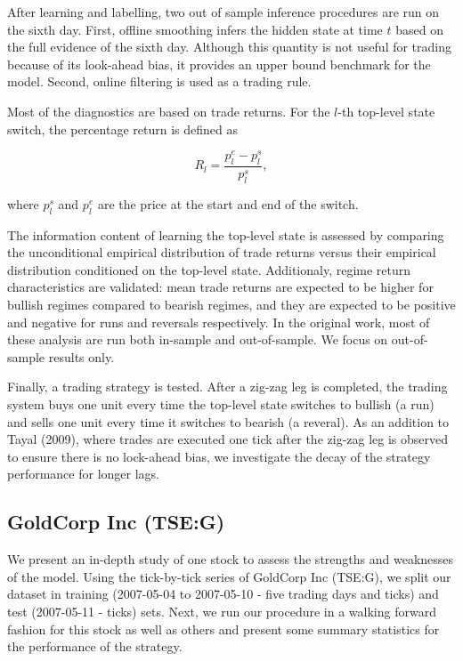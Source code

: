 \documentclass[]{article}
\begin{document}
After learning and labelling, two out of sample inference procedures are
run on the sixth day. First, offline smoothing infers the hidden state
at time \(t\) based on the full evidence of the sixth day. Although this
quantity is not useful for trading because of its look-ahead bias, it
provides an upper bound benchmark for the model. Second, online
filtering is used as a trading rule.

Most of the diagnostics are based on trade returns. For the \(l\)-th
top-level state switch, the percentage return is defined as

\[
R_l = \frac{p^e_l - p^s_l}{p^s_l},
\]

where \(p^s_l\) and \(p^e_l\) are the price at the start and end of the
switch.

The information content of learning the top-level state is assessed by
comparing the unconditional empirical distribution of trade returns
versus their empirical distribution conditioned on the top-level state.
Additionaly, regime return characteristics are validated: mean trade
returns are expected to be higher for bullish regimes compared to
bearish regimes, and they are expected to be positive and negative for
runs and reversals respectively. In the original work, most of these
analysis are run both in-sample and out-of-sample. We focus on
out-of-sample results only.

Finally, a trading strategy is tested. After a zig-zag leg is completed,
the trading system buys one unit every time the top-level state switches
to bullish (a run) and sells one unit every time it switches to bearish
(a reveral). As an addition to Tayal (2009), where trades are executed
one tick after the zig-zag leg is observed to ensure there is no
lock-ahead bias, we investigate the decay of the strategy performance
for longer lags.

\subsection{GoldCorp Inc (TSE:G)}\label{goldcorp-inc-tseg}

We present an in-depth study of one stock to assess the strengths and
weaknesses of the model. Using the tick-by-tick series of GoldCorp Inc
(TSE:G), we split our dataset in training (2007-05-04 to 2007-05-10 -
five trading days and ticks) and test (2007-05-11 - ticks) sets. Next,
we run our procedure in a walking forward fashion for this stock as well
as others and present some summary statistics for the performance of the
strategy.
\end{document}
